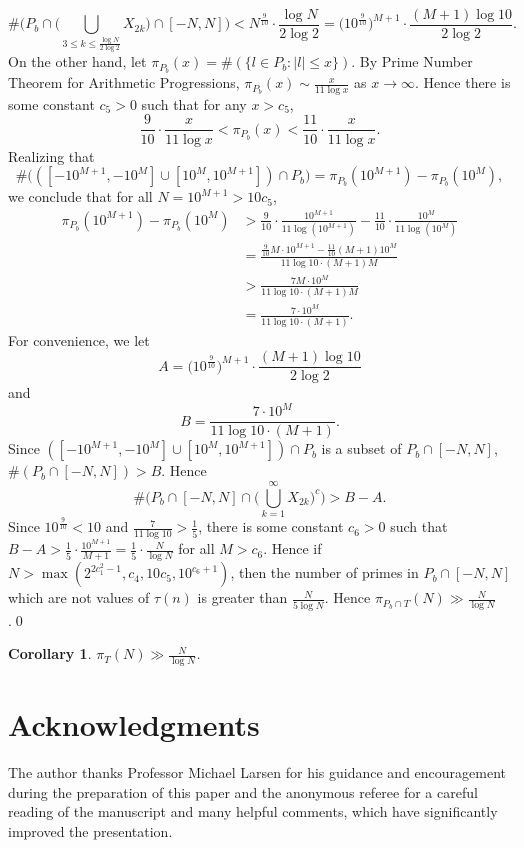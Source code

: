 \documentclass[12pt]{amsart}
\newtheorem{cor}[thm]{Corollary}
\numberwithin{equation}{section}
\begin{document}
\begin{equation}\label{AA}
    \#\bigg(P_b\cap\bigg(\bigcup_{3\leq k\leq \frac{\log N}{2\log2}}X_{2k}\bigg)\cap[-N,N]\bigg) < N^{\frac{9}{10}}\cdot\frac{\log N}{2\log2}=\bigg(10^{\frac{9}{10}}\bigg)^{M+1}\cdot\frac{(M+1)\log10}{2\log2}.
\end{equation} 
On the other hand, let $\pi_{P_b}(x) = \# (\{l\in P_b\colon |l|\leq x\})$. By Prime Number Theorem for Arithmetic Progressions, $\pi_{P_b}(x)\sim \frac{x}{11\log x}$ as $x\to \infty$. Hence there is some constant $c_5>0$ such that for any $x>c_5$, $$\frac{9}{10}\cdot\frac{x}{11\log x}<\pi_{P_b}(x)<\frac{11}{10}\cdot\frac{x}{11\log x}.$$
Realizing that $$\#\bigg(([-10^{M+1},-10^M]\cup[10^M,10^{M+1}])\cap P_b\bigg) = \pi_{P_b}(10^{M+1})-\pi_{P_b}(10^M),$$ we conclude that for all $N=10^{M+1}>10c_5$, 
\begin{align*}
    \pi_{P_b}(10^{M+1})-\pi_{P_b}(10^M)&>\frac{9}{10}\cdot\frac{10^{M+1}}{11\log(10^{M+1})}-\frac{11}{10}\cdot\frac{10^M}{11\log(10^M)}\\
    &=\frac{\frac{9}{10}M\cdot10^{M+1}-\frac{11}{10}(M+1)10^M}{11\log10\cdot(M+1)M}\\
    &>\frac{7M\cdot 10^M}{11\log10\cdot(M+1)M}\\
    &=\frac{7\cdot10^M}{11\log10\cdot(M+1)}.
\end{align*} 
For convenience, we let $$A = \bigg(10^{\frac{9}{10}}\bigg)^{M+1}\cdot\frac{(M+1)\log10}{2\log2}$$ and $$B = \frac{7\cdot10^M}{11\log10\cdot(M+1)}.$$
Since $([-10^{M+1},-10^M]\cup[10^M,10^{M+1}])\cap P_b$ is a subset of $P_b\cap[-N,N]$,  $\#(P_b\cap[-N,N])>B$. Hence  $$\#\bigg(P_b\cap[-N,N]\cap\bigg(\bigcup_{k=1}^\infty X_{2k}\bigg)^c\bigg) > B - A.$$  Since $10^{\frac{9}{10}}<10$ and $\frac{7}{11\log10}>\frac{1}{5}$, there is some constant $c_6>0$ such that $B-A>\frac{1}{5}\cdot\frac{10^{M+1}}{M+1}=\frac{1}{5}\cdot\frac{N}{\log N}$ for all $M>c_6$. Hence if $N>\max(2^{2c_1^2-1},c_4,10c_5,10^{c_6+1})$, then the number of primes in $P_b\cap[-N,N]$ which are not values of $\tau(n)$ is greater than $\frac{N}{5\log N}$. Hence $\pi_{P_b\cap T}(N) \gg \frac{N}{\log N}$.\qed  
\begin{cor}
    $\pi_T(N) \gg \frac{N}{\log N}$.
\end{cor}

\section*{Acknowledgments}
The author thanks Professor Michael Larsen for his guidance and encouragement during the preparation of this paper and the anonymous referee for a careful reading of the manuscript and many helpful comments, which have significantly improved the presentation. 
\end{document}
